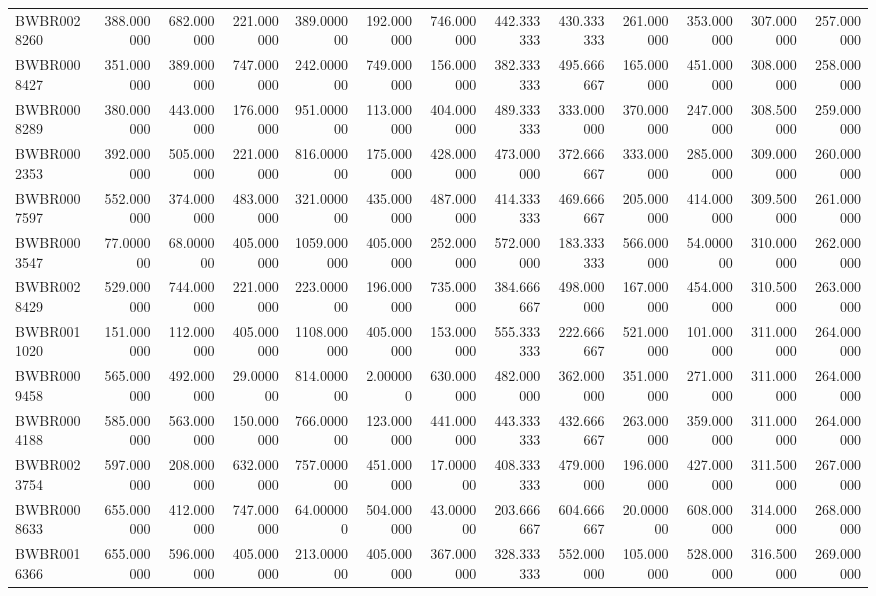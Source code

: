 \begin{longtable}{lrrrrrrrrrrrr}
BWBR0028260 & 388.000000 & 682.000000 & 221.000000 & 389.000000 & 192.000000 & 746.000000 & 442.333333 & 430.333333 & 261.000000 & 353.000000 & 307.000000 & 257.000000 \\
BWBR0008427 & 351.000000 & 389.000000 & 747.000000 & 242.000000 & 749.000000 & 156.000000 & 382.333333 & 495.666667 & 165.000000 & 451.000000 & 308.000000 & 258.000000 \\
BWBR0008289 & 380.000000 & 443.000000 & 176.000000 & 951.000000 & 113.000000 & 404.000000 & 489.333333 & 333.000000 & 370.000000 & 247.000000 & 308.500000 & 259.000000 \\
BWBR0002353 & 392.000000 & 505.000000 & 221.000000 & 816.000000 & 175.000000 & 428.000000 & 473.000000 & 372.666667 & 333.000000 & 285.000000 & 309.000000 & 260.000000 \\
BWBR0007597 & 552.000000 & 374.000000 & 483.000000 & 321.000000 & 435.000000 & 487.000000 & 414.333333 & 469.666667 & 205.000000 & 414.000000 & 309.500000 & 261.000000 \\
BWBR0003547 & 77.000000 & 68.000000 & 405.000000 & 1059.000000 & 405.000000 & 252.000000 & 572.000000 & 183.333333 & 566.000000 & 54.000000 & 310.000000 & 262.000000 \\
BWBR0028429 & 529.000000 & 744.000000 & 221.000000 & 223.000000 & 196.000000 & 735.000000 & 384.666667 & 498.000000 & 167.000000 & 454.000000 & 310.500000 & 263.000000 \\
BWBR0011020 & 151.000000 & 112.000000 & 405.000000 & 1108.000000 & 405.000000 & 153.000000 & 555.333333 & 222.666667 & 521.000000 & 101.000000 & 311.000000 & 264.000000 \\
BWBR0009458 & 565.000000 & 492.000000 & 29.000000 & 814.000000 & 2.000000 & 630.000000 & 482.000000 & 362.000000 & 351.000000 & 271.000000 & 311.000000 & 264.000000 \\
BWBR0004188 & 585.000000 & 563.000000 & 150.000000 & 766.000000 & 123.000000 & 441.000000 & 443.333333 & 432.666667 & 263.000000 & 359.000000 & 311.000000 & 264.000000 \\
BWBR0023754 & 597.000000 & 208.000000 & 632.000000 & 757.000000 & 451.000000 & 17.000000 & 408.333333 & 479.000000 & 196.000000 & 427.000000 & 311.500000 & 267.000000 \\
BWBR0008633 & 655.000000 & 412.000000 & 747.000000 & 64.000000 & 504.000000 & 43.000000 & 203.666667 & 604.666667 & 20.000000 & 608.000000 & 314.000000 & 268.000000 \\
BWBR0016366 & 655.000000 & 596.000000 & 405.000000 & 213.000000 & 405.000000 & 367.000000 & 328.333333 & 552.000000 & 105.000000 & 528.000000 & 316.500000 & 269.000000 \\

\end{longtable}

